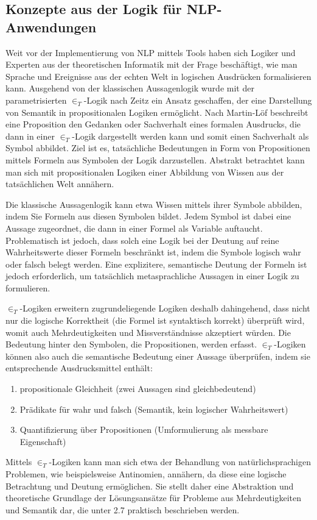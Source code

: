 \documentclass[12pt]{report}
\begin{document}
\subsection{Konzepte aus der Logik für NLP-Anwendungen}
Weit vor der Implementierung von NLP mittels Tools haben sich Logiker und Experten aus der theoretischen Informatik mit der Frage beschäftigt, wie man Sprache und Ereignisse aus der echten Welt in logischen Ausdrücken formalisieren kann. Ausgehend von der klassischen Aussagenlogik wurde mit der parametrisierten $\in_T$-Logik nach Zeitz \cite{ze00} ein Ansatz geschaffen, der eine Darstellung von Semantik in propositionalen Logiken ermöglicht. Nach Martin-Löf \cite{ml96} beschreibt eine Proposition den \glqq  Gedanken oder Sachverhalt eines formalen Ausdrucks\grqq{}, die dann in einer $\in_T$-Logik dargestellt werden kann und somit einen Sachverhalt als Symbol abbildet. Ziel ist es, tatsächliche Bedeutungen in Form von Propositionen mittels Formeln aus Symbolen der Logik darzustellen. Abstrakt betrachtet kann man sich mit propositionalen Logiken einer Abbildung von Wissen aus der tatsächlichen Welt annähern. 

Die klassische Aussagenlogik kann etwa Wissen mittels ihrer Symbole abbilden, indem Sie Formeln aus diesen Symbolen bildet. Jedem Symbol ist dabei eine Aussage zugeordnet, die dann in einer Formel als Variable auftaucht. Problematisch ist jedoch, dass solch eine Logik bei der Deutung auf reine Wahrheitswerte dieser Formeln beschränkt ist, indem die Symbole logisch wahr oder falsch belegt werden. Eine explizitere, semantische Deutung der Formeln ist jedoch erforderlich, um tatsächlich metasprachliche Aussagen in einer Logik zu formulieren. 

$\in_T$-Logiken erweitern zugrundeliegende Logiken deshalb dahingehend, dass nicht nur die logische Korrektheit (die Formel ist syntaktisch korrekt) überprüft wird, womit auch Mehrdeutigkeiten und Missverständnisse akzeptiert würden. Die Bedeutung hinter den Symbolen, die Propositionen, werden erfasst. $\in_T$-Logiken können also auch die semantische Bedeutung einer Aussage überprüfen, indem sie entsprechende Ausdrucksmittel enthält:
\begin{enumerate}
\item propositionale Gleichheit (zwei Aussagen sind gleichbedeutend)
\item Prädikate für wahr und falsch (Semantik, kein logischer Wahrheitswert)
\item Quantifizierung über Propositionen (Umformulierung als messbare Eigenschaft)
\end{enumerate}
Mittels $\in_T$-Logiken kann man sich etwa der Behandlung von natürlichsprachigen Problemen, wie beispielsweise Antinomien, annähern, da diese eine logische Betrachtung und Deutung ermöglichen. Sie stellt daher eine Abstraktion und theoretische Grundlage der Lösungsansätze für Probleme aus Mehrdeutigkeiten und Semantik dar, die unter 2.7 praktisch beschrieben werden.
\end{document}
